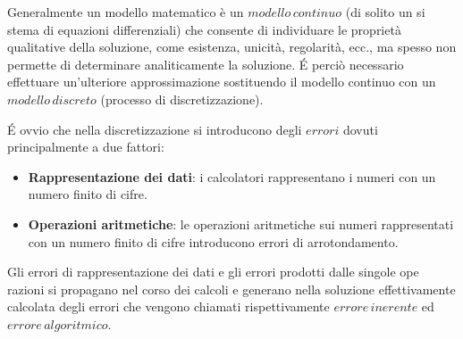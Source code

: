 \documentclass[10pt]{styles}
\begin{document}
Generalmente un modello matematico è un $modello \, continuo$ (di solito un si
stema di equazioni differenziali) che consente di individuare le proprietà qualitative
della soluzione, come esistenza, unicità, regolarità, ecc., ma spesso non permette di
determinare analiticamente la soluzione. \' E perciò necessario effettuare un'ulteriore
approssimazione sostituendo il modello continuo con un $modello \, discreto$ (processo di
discretizzazione).


\'E ovvio che nella discretizzazione si introducono degli $errori$ dovuti principalmente a due fattori:
\begin{itemize}
\item \textbf{Rappresentazione dei dati}: i calcolatori rappresentano i numeri con un numero finito di cifre.
\item \textbf{Operazioni aritmetiche}: le operazioni aritmetiche sui numeri rappresentati con un numero finito di cifre introducono errori di arrotondamento.
\end{itemize}

Gli errori di rappresentazione dei dati e gli errori prodotti dalle singole ope
razioni si propagano nel corso dei calcoli e generano nella soluzione effettivamente
calcolata degli errori che vengono chiamati rispettivamente $errore \, inerente$ ed $errore \, algoritmico$.

\end{document}
